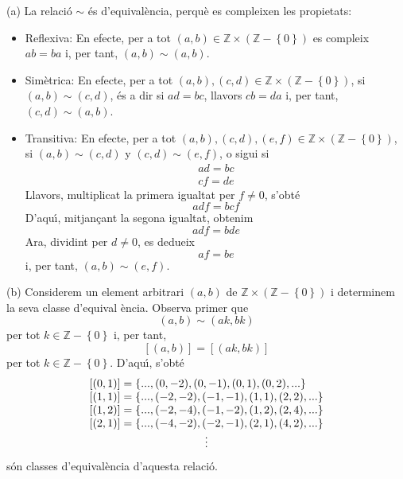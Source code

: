 \begin{solucio}
(a) La relaci\'{o} $\sim $ \'{e}s d'equival\`{e}ncia, perqu\`{e} es
compleixen les propietats:

\begin{itemize}
\item Reflexiva: En efecte, per a tot $(a,b)\in \mathbb{Z}\times \left(
\mathbb{Z}-\left\{ 0\right\} \right) $ es compleix $ab=ba$ i, per tant, $%
(a,b)\sim (a,b)$.

\item Sim\`{e}trica: En efecte, per a tot $(a,b),(c,d)\in \mathbb{Z}\times
\left( \mathbb{Z}-\left\{ 0\right\} \right) $, si $(a,b)\sim (c,d)$, \'{e}s
a dir si $ad=bc$, llavors $cb=da$ i, per tant, $(c,d)\sim (a,b)$.

\item Transitiva: En efecte, per a tot $(a,b),(c,d),(e,f)\in \mathbb{Z}%
\times \left( \mathbb{Z}-\left\{ 0\right\} \right) $, si $(a,b)\sim (c,d)$ y
$(c,d)\sim (e,f)$, o sigui si%
\begin{equation*}
\begin{array}{c}
ad=bc \\
cf=de%
\end{array}%
\end{equation*}%
Llavors, multiplicat la primera igualtat per $f\neq 0$, s'obt\'{e}%
\begin{equation*}
adf=bcf
\end{equation*}%
D'aqu\'{\i}, mitjan\c{c}ant la segona igualtat, obtenim%
\begin{equation*}
adf=bde
\end{equation*}%
Ara, dividint per $d\neq 0$, es dedueix%
\begin{equation*}
af=be
\end{equation*}%
i, per tant, $(a,b)\sim (e,f)$.
\end{itemize}

(b) Considerem un element arbitrari $(a,b)$ de $\mathbb{Z}\times \left(
\mathbb{Z}-\left\{ 0\right\} \right) $ i determinem la seva classe d'equival%
\`{e}ncia. Observa primer que%
\begin{equation*}
(a,b)\sim (ak,bk)
\end{equation*}%
per tot $k\in \mathbb{Z}-\left\{ 0\right\} $ i, per tant,%
\begin{equation*}
\left[ (a,b)\right] =\left[ (ak,bk)\right]
\end{equation*}%
per tot $k\in \mathbb{Z}-\left\{ 0\right\} $. D'aqu\'{\i}, s'obt\'{e}%
\begin{equation*}
\begin{array}{l}
\left[ (0,1)\right] =\left\{ ...,(0,-2),(0,-1),(0,1),(0,2),...\right\} \\
\left[ (1,1)\right] =\left\{ ...,(-2,-2),(-1,-1),(1,1),(2,2),...\right\} \\
\left[ (1,2)\right] =\left\{ ...,(-2,-4),(-1,-2),(1,2),(2,4),...\right\} \\
\left[ (2,1)\right] =\left\{ ...,(-4,-2),(-2,-1),(2,1),(4,2),...\right\} \\
\multicolumn{1}{c}{\vdots}%
\end{array}%
\end{equation*}%
s\'{o}n classes d'equival\`{e}ncia d'aquesta relaci\'{o}.


\end{solucio}
